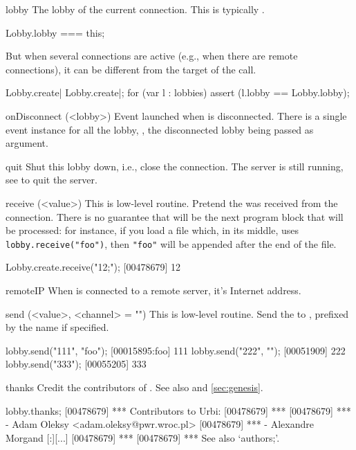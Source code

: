 \begin{urbiscriptapi}
\item[lobby]
  The lobby of the current connection.  This is typically \this.
\begin{urbiassert}
Lobby.lobby === this;
\end{urbiassert}

  But when several connections are active (e.g., when there are remote
  connections), it can be different from the target of the call.

\begin{urbiscript}
Lobby.create| Lobby.create|;
for (var l : lobbies)
  assert (l.lobby == Lobby.lobby);
\end{urbiscript}

\item[onDisconnect](<lobby>)%
  Event launched when \this is disconnected.  There is a single event
  instance for all the lobby, , the
  disconnected lobby being passed as argument.

\item[quit] Shut this lobby down, i.e., close the connection.  The
  server is still running, see  to quit the
  server.

\item[receive](<value>)%
  This is low-level routine.  Pretend the 
   was received from the connection.  There is no guarantee
  that  will be the next program block that will be
  processed: for instance, if you load a file which, in its middle,
  uses \lstinline|lobby.receive("foo")|, then \lstinline|"foo"| will
  be appended after the end of the file.
\begin{urbiscript}
Lobby.create.receive("12;");
[00478679] 12
\end{urbiscript}

\item[remoteIP]
  When \this is connected to a remote server, it's Internet address.

\item[send](<value>, <channel> = "")%
  This is low-level routine.  Send the  
  to \this, prefixed by the 
   name if specified.
\begin{urbiscript}
lobby.send("111", "foo");
[00015895:foo] 111
lobby.send("222", "");
[00051909] 222
lobby.send("333");
[00055205] 333
\end{urbiscript}


\item[thanks] Credit the contributors of \usdk.  See also 
  and \autoref{sec:genesis}.
\begin{urbiunchecked}
lobby.thanks;
[00478679] *** Contributors to Urbi:
[00478679] ***
[00478679] ***  - Adam Oleksy <adam.oleksy@pwr.wroc.pl>
[00478679] ***  - Alexandre Morgand
[:][...]
[00478679] ***
[00478679] *** See also `authors;'.
\end{urbiunchecked}



\end{urbiscriptapi}

